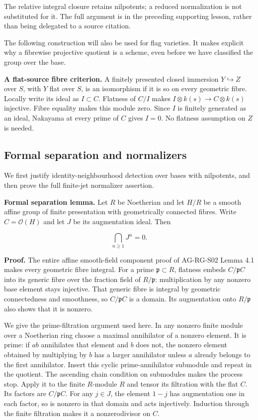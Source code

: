 \documentclass[11pt,a4paper,openany]{report}
\begin{document}
The relative integral closure retains nilpotents; a reduced normalization is not substituted for it. The full argument is in the preceding supporting lesson, rather than being delegated to a source citation.

The following construction will also be used for flag varieties. It makes explicit why a fibrewise projective quotient is a scheme, even before we have classified the group over the base.

\textbf{A flat-source fibre criterion.} A finitely presented closed immersion \(Y\hookrightarrow Z\) over \(S\), with \(Y\) flat over \(S\), is an isomorphism if it is so on every geometric fibre. Locally write its ideal as \(I\subset C\). Flatness of \(C/I\) makes \(I\otimes k(s)\to C\otimes k(s)\) injective. Fibre equality makes this module zero. Since \(I\) is finitely generated as an ideal, Nakayama at every prime of \(C\) gives \(I=0\). No flatness assumption on \(Z\) is needed.

\subsection{Formal separation and normalizers}\label{AG-RG-03-formal-separation-and-normalizers}

We first justify identity-neighbourhood detection over bases with nilpotents, and then prove the full finite-jet normalizer assertion.

\textbf{Formal separation lemma.} Let \(R\) be Noetherian and let \(H/R\) be a smooth affine group of finite presentation with geometrically connected fibres. Write \(C=\mathcal O(H)\) and let \(J\) be its augmentation ideal. Then

\[
\bigcap_{n\geq 1}J^n=0.
\]

\textbf{Proof.} The entire affine smooth-field component proof of AG-RG-S02 Lemma 4.1 makes every geometric fibre integral. For a prime \(\mathfrak p\subset R\), flatness embeds \(C/\mathfrak pC\) into its generic fibre over the fraction field of \(R/\mathfrak p\): multiplication by any nonzero base element stays injective. That generic fibre is integral by geometric connectedness and smoothness, so \(C/\mathfrak pC\) is a domain. Its augmentation onto \(R/\mathfrak p\) also shows that it is nonzero.

We give the prime-filtration argument used here. In any nonzero finite module over a Noetherian ring choose a maximal annihilator of a nonzero element. It is prime: if \(ab\) annihilates that element and \(b\) does not, the nonzero element obtained by multiplying by \(b\) has a larger annihilator unless \(a\) already belongs to the first annihilator. Insert this cyclic prime-annihilator submodule and repeat in the quotient. The ascending chain condition on submodules makes the process stop. Apply it to the finite \(R\)-module \(R\) and tensor its filtration with the flat \(C\). Its factors are \(C/\mathfrak pC\). For any \(j\in J\), the element \(1-j\) has augmentation one in each factor, so is nonzero in that domain and acts injectively. Induction through the finite filtration makes it a nonzerodivisor on \(C\).
\end{document}
